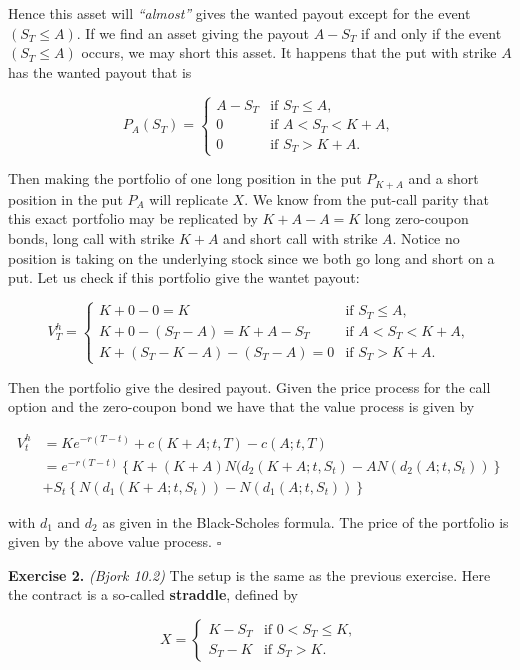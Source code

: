 \documentclass[
]{book}
\begin{document}
Hence this asset will \emph{``almost''} gives the wanted payout except for the event \((S_T\le A)\). If we find an asset giving the payout \(A-S_T\) if and only if the event \((S_T\le A)\) occurs, we may short this asset. It happens that the put with strike \(A\) has the wanted payout that is

\[
P_{A}(S_T)=
\begin{cases}
  A-S_T & \text{if }S_T\le A,\\
  0 & \text{if }A<S_T<K+ A,\\
  0 & \text{if }S_T > K+ A.
\end{cases}
\]

Then making the portfolio of one long position in the put \(P_{K+A}\) and a short position in the put \(P_A\) will replicate \(X\). We know from the put-call parity that this exact portfolio may be replicated by \(K+A-A=K\) long zero-coupon bonds, long call with strike \(K+A\) and short call with strike \(A\). Notice no position is taking on the underlying stock since we both go long and short on a put. Let us check if this portfolio give the wantet payout:

\[
V^h_T=
\begin{cases}
  K +0-0 = K & \text{if }S_T\le A,\\
  K + 0 - (S_T-A)=K+A-S_T & \text{if }A<S_T<K+ A,\\
  K + (S_T-K-A)-(S_T-A)=0 & \text{if }S_T > K+ A.
\end{cases}
\]

Then the portfolio give the desired payout. Given the price process for the call option and the zero-coupon bond we have that the value process is given by

\begin{align*}
V_t^h&=Ke^{-r(T-t)}+c(K+A;t,T)-c(A;t,T)\\
&=e^{-r(T-t)}\left\{K+(K+A)N(d_2(K+A;t,S_t)-AN(d_2(A;t,S_t))\right\}\\
&+S_t\left\{N(d_1(K+A;t,S_t))-N(d_1(A;t,S_t))\right\}
\end{align*}

with \(d_1\) and \(d_2\) as given in the Black-Scholes formula. The price of the portfolio is given by the above value process. \(\square\)

\textbf{Exercise 2.} \emph{(Bjork 10.2)} The setup is the same as the previous exercise. Here the contract is a so-called \textbf{straddle}, defined by

\[
X=
\begin{cases}
  K-S_T & \text{if }0<S_T\le K,\\
  S_T-K & \text{if }S_T>K.
\end{cases}
\]
\end{document}
